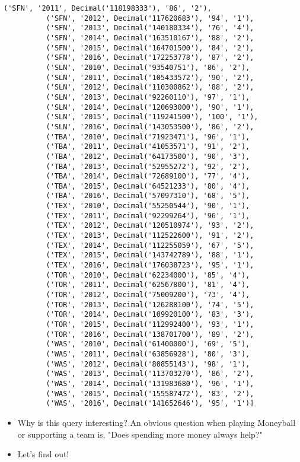 \documentclass[11pt]{article}
\begin{document}
\begin{Verbatim}[commandchars=\\\{\}]
          ('SFN', '2011', Decimal('118198333'), '86', '2'),
          ('SFN', '2012', Decimal('117620683'), '94', '1'),
          ('SFN', '2013', Decimal('140180334'), '76', '4'),
          ('SFN', '2014', Decimal('163510167'), '88', '2'),
          ('SFN', '2015', Decimal('164701500'), '84', '2'),
          ('SFN', '2016', Decimal('172253778'), '87', '2'),
          ('SLN', '2010', Decimal('93540751'), '86', '2'),
          ('SLN', '2011', Decimal('105433572'), '90', '2'),
          ('SLN', '2012', Decimal('110300862'), '88', '2'),
          ('SLN', '2013', Decimal('92260110'), '97', '1'),
          ('SLN', '2014', Decimal('120693000'), '90', '1'),
          ('SLN', '2015', Decimal('119241500'), '100', '1'),
          ('SLN', '2016', Decimal('143053500'), '86', '2'),
          ('TBA', '2010', Decimal('71923471'), '96', '1'),
          ('TBA', '2011', Decimal('41053571'), '91', '2'),
          ('TBA', '2012', Decimal('64173500'), '90', '3'),
          ('TBA', '2013', Decimal('52955272'), '92', '2'),
          ('TBA', '2014', Decimal('72689100'), '77', '4'),
          ('TBA', '2015', Decimal('64521233'), '80', '4'),
          ('TBA', '2016', Decimal('57097310'), '68', '5'),
          ('TEX', '2010', Decimal('55250544'), '90', '1'),
          ('TEX', '2011', Decimal('92299264'), '96', '1'),
          ('TEX', '2012', Decimal('120510974'), '93', '2'),
          ('TEX', '2013', Decimal('112522600'), '91', '2'),
          ('TEX', '2014', Decimal('112255059'), '67', '5'),
          ('TEX', '2015', Decimal('143742789'), '88', '1'),
          ('TEX', '2016', Decimal('176038723'), '95', '1'),
          ('TOR', '2010', Decimal('62234000'), '85', '4'),
          ('TOR', '2011', Decimal('62567800'), '81', '4'),
          ('TOR', '2012', Decimal('75009200'), '73', '4'),
          ('TOR', '2013', Decimal('126288100'), '74', '5'),
          ('TOR', '2014', Decimal('109920100'), '83', '3'),
          ('TOR', '2015', Decimal('112992400'), '93', '1'),
          ('TOR', '2016', Decimal('138701700'), '89', '2'),
          ('WAS', '2010', Decimal('61400000'), '69', '5'),
          ('WAS', '2011', Decimal('63856928'), '80', '3'),
          ('WAS', '2012', Decimal('80855143'), '98', '1'),
          ('WAS', '2013', Decimal('113703270'), '86', '2'),
          ('WAS', '2014', Decimal('131983680'), '96', '1'),
          ('WAS', '2015', Decimal('155587472'), '83', '2'),
          ('WAS', '2016', Decimal('141652646'), '95', '1')]
\end{Verbatim}
            
    \begin{itemize}
\item
  Why is this query interesting? An obvious question when playing
  Moneyball or supporting a team is, "Does spending more money always
  help?"
\item
  Let's find out!
\end{itemize}
\end{document}
